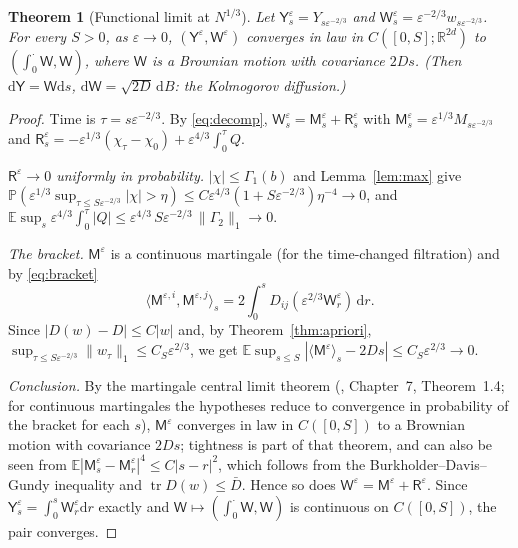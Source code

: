 \documentclass[11pt]{article}
\newcommand{\dd}{\mathrm{d}}
\newcommand{\E}{\mathbb{E}}
\newcommand{\eps}{\varepsilon}
\newcommand{\nrm}[2]{\|#1\|_{#2}}
\newcommand{\tr}{\operatorname{tr}}
\newtheorem{theorem}{Theorem}
\theoremstyle{remark}
\begin{document}
\begin{theorem}[Functional limit at $N^{1/3}$]\label{thm:func}
Let $\mathsf{Y}^\eps_s = Y_{s\eps^{-2/3}}$ and
$\mathsf{W}^\eps_s = \eps^{-2/3}w_{s\eps^{-2/3}}$. For every $S>0$, as
$\eps\to0$, $(\mathsf{Y}^\eps,\mathsf{W}^\eps)$ converges in law in
$C([0,S];\mathbb{R}^{2d})$ to $(\int_0^\cdot\mathsf{W},\mathsf{W})$, where
$\mathsf{W}$ is a Brownian motion with covariance $2Ds$. (Then
$\dd\mathsf{Y}=\mathsf{W}\dd s$, $\dd\mathsf{W} = \sqrt{2D}\,\dd B$: the
Kolmogorov diffusion.)
\end{theorem}

\begin{proof}
Time is $\tau = s\eps^{-2/3}$. By \eqref{eq:decomp},
$\mathsf{W}^\eps_s = \mathsf{M}^\eps_s + \mathsf{R}^\eps_s$ with
$\mathsf{M}^\eps_s = \eps^{1/3}M_{s\eps^{-2/3}}$ and
$\mathsf{R}^\eps_s = -\eps^{1/3}(\chi_\tau-\chi_0) + \eps^{4/3}\int_0^\tau Q$.

\emph{$\mathsf{R}^\eps\to0$ uniformly in probability.}
$|\chi|\le\Gamma_1(b)$ and Lemma~\ref{lem:max} give
$\mathbb{P}(\eps^{1/3}\sup_{\tau\le S\eps^{-2/3}}|\chi|>\eta)
\le C\eps^{4/3}(1+S\eps^{-2/3})\eta^{-4}\to0$, and
$\E\sup_s\eps^{4/3}\int_0^\tau|Q|\le\eps^{4/3}\,S\eps^{-2/3}\,\nrm{\Gamma_2}{1}\to0$.

\emph{The bracket.} $\mathsf{M}^\eps$ is a continuous martingale (for the
time-changed filtration) and by \eqref{eq:bracket}
\[
  \langle\mathsf{M}^{\eps,i},\mathsf{M}^{\eps,j}\rangle_s
  = 2\int_0^sD_{ij}(\eps^{2/3}\mathsf{W}^\eps_r)\,\dd r .
\]
Since $|D(w)-D|\le C|w|$ and, by Theorem~\ref{thm:apriori},
$\sup_{\tau\le S\eps^{-2/3}}\nrm{w_\tau}{1}\le C_S\eps^{2/3}$, we get
$\E\sup_{s\le S}|\langle\mathsf{M}^\eps\rangle_s - 2Ds|
\le C_S\eps^{2/3}\to0$.

\emph{Conclusion.} By the martingale central limit theorem
(\cite{EK}, Chapter~7, Theorem~1.4; for continuous martingales the
hypotheses reduce to convergence in probability of the bracket for each
$s$), $\mathsf{M}^\eps$ converges in law in $C([0,S])$ to a Brownian motion
with covariance $2Ds$; tightness is part of that theorem, and can also be
seen from $\E|\mathsf{M}^\eps_s-\mathsf{M}^\eps_r|^4\le C|s-r|^2$, which
follows from the Burkholder--Davis--Gundy inequality and
$\tr D(w)\le\bar D$. Hence so does
$\mathsf{W}^\eps = \mathsf{M}^\eps + \mathsf{R}^\eps$. Since
$\mathsf{Y}^\eps_s = \int_0^s\mathsf{W}^\eps_r\dd r$ exactly and
$\mathsf{W}\mapsto(\int_0^\cdot\mathsf{W},\mathsf{W})$ is continuous on
$C([0,S])$, the pair converges.
\end{proof}
\end{document}
